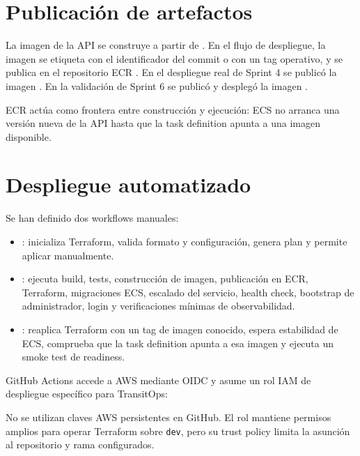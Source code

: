 \section{Publicación de artefactos}
\label{sec:publicacion-artefactos}

La imagen de la API se construye a partir de . En el flujo de despliegue, la imagen se etiqueta con el identificador del commit o con un tag operativo, y se publica en el repositorio ECR . En el despliegue real de Sprint 4 se publicó la imagen . En la validación de Sprint 6 se publicó y desplegó la imagen .

ECR actúa como frontera entre construcción y ejecución: ECS no arranca una versión nueva de la API hasta que la task definition apunta a una imagen disponible.

\section{Despliegue automatizado}
\label{sec:despliegue-automatizado}

Se han definido dos workflows manuales:

\begin{itemize}
  \item {}: inicializa Terraform, valida formato y configuración, genera plan y permite aplicar manualmente.
  \item {}: ejecuta build, tests, construcción de imagen, publicación en ECR, Terraform, migraciones ECS, escalado del servicio, health check, bootstrap de administrador, login y verificaciones mínimas de observabilidad.
  \item {}: reaplica Terraform con un tag de imagen conocido, espera estabilidad de ECS, comprueba que la task definition apunta a esa imagen y ejecuta un smoke test de readiness.
\end{itemize}

GitHub Actions accede a AWS mediante OIDC y asume un rol IAM de despliegue específico para TransitOps:

\begin{center}
{\small{}}
\end{center}

No se utilizan claves AWS persistentes en GitHub. El rol mantiene permisos amplios para operar Terraform sobre \texttt{dev}, pero su trust policy limita la asunción al repositorio y rama configurados.

